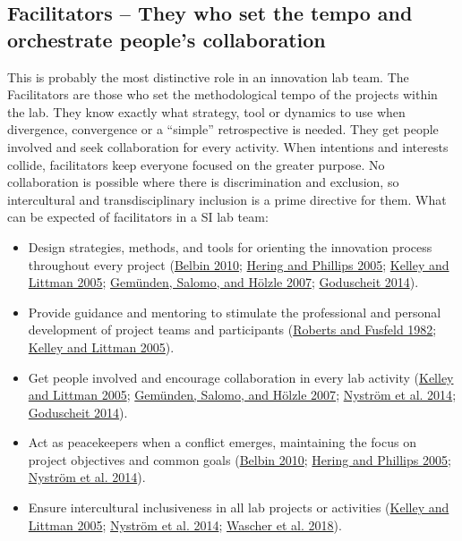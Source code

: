 \documentclass[AMA,STIX1COL,APA,STIX2COL]{WileyNJD-v2}
\providecommand{\tightlist}{%
  \setlength{\itemsep}{0pt}\setlength{\parskip}{0pt}}
\begin{document}
\hypertarget{facilitators-they-who-set-the-tempo-and-orchestrate-peoples-collaboration}{%
\subsection{Facilitators -- They who set the tempo and orchestrate
people's
collaboration}\label{facilitators-they-who-set-the-tempo-and-orchestrate-peoples-collaboration}}

This is probably the most distinctive role in an innovation lab team.
The Facilitators are those who set the methodological tempo of the
projects within the lab. They know exactly what strategy, tool or
dynamics to use when divergence, convergence or a ``simple''
retrospective is needed. They get people involved and seek collaboration
for every activity. When intentions and interests collide, facilitators
keep everyone focused on the greater purpose. No collaboration is
possible where there is discrimination and exclusion, so intercultural
and transdisciplinary inclusion is a prime directive for them. What can
be expected of facilitators in a SI lab team:

\begin{itemize}
\tightlist
\item
  Design strategies, methods, and tools for orienting the innovation
  process throughout every project
  (\protect\hyperlink{ref-Belbin2010}{Belbin 2010};
  \protect\hyperlink{ref-Hering2005}{Hering and Phillips 2005};
  \protect\hyperlink{ref-Kelley2005}{Kelley and Littman 2005};
  \protect\hyperlink{ref-Gemunden2007}{Gemünden, Salomo, and Hölzle
  2007}; \protect\hyperlink{ref-Goduscheit2014}{Goduscheit 2014}).
\item
  Provide guidance and mentoring to stimulate the professional and
  personal development of project teams and participants
  (\protect\hyperlink{ref-Roberts1982}{Roberts and Fusfeld 1982};
  \protect\hyperlink{ref-Kelley2005}{Kelley and Littman 2005}).
\item
  Get people involved and encourage collaboration in every lab activity
  (\protect\hyperlink{ref-Kelley2005}{Kelley and Littman 2005};
  \protect\hyperlink{ref-Gemunden2007}{Gemünden, Salomo, and Hölzle
  2007}; \protect\hyperlink{ref-Nystrom2014}{Nyström et al. 2014};
  \protect\hyperlink{ref-Goduscheit2014}{Goduscheit 2014}).
\item
  Act as peacekeepers when a conflict emerges, maintaining the focus on
  project objectives and common goals
  (\protect\hyperlink{ref-Belbin2010}{Belbin 2010};
  \protect\hyperlink{ref-Hering2005}{Hering and Phillips 2005};
  \protect\hyperlink{ref-Nystrom2014}{Nyström et al. 2014}).
\item
  Ensure intercultural inclusiveness in all lab projects or activities
  (\protect\hyperlink{ref-Kelley2005}{Kelley and Littman 2005};
  \protect\hyperlink{ref-Nystrom2014}{Nyström et al. 2014};
  \protect\hyperlink{ref-Wascher2018}{Wascher et al. 2018}).
\end{itemize}
\end{document}
